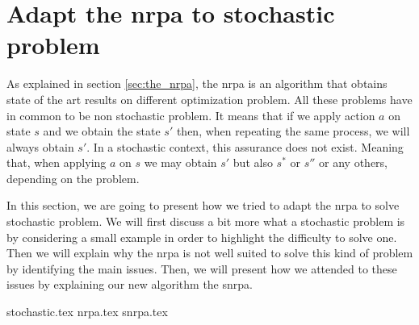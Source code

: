 \section{Adapt the \acrshort{nrpa} to stochastic problem}%
\label{sec:adapt_the_nrpa_to_stochastic_problem}

As explained in section \ref{sec:the_nrpa}, the \gls{nrpa} is an algorithm that obtains state of the art results on different optimization problem.
All these problems have in common to be non stochastic problem.
It means that if we apply action \(a\) on state \(s\) and we obtain the state \(s'\) then, when repeating the same process, we will always obtain \(s'\).
In a stochastic context, this assurance does not exist.
Meaning that, when applying \(a\) on \(s\) we may obtain \(s'\) but also \(s^{*}\) or \(s''\)  or any others, depending on the problem.

In this section, we are going to present how we tried to adapt the \gls{nrpa} to solve stochastic problem.
We will first discuss a bit more what a stochastic problem is by considering a small example in order to highlight the difficulty to solve one.
Then we will explain why the \gls{nrpa} is not well suited to solve this kind of problem by identifying the main issues.
Then, we will present how we attended to these issues by explaining our new algorithm the \gls{snrpa}.

{stochastic.tex}
{nrpa.tex}
{snrpa.tex}


